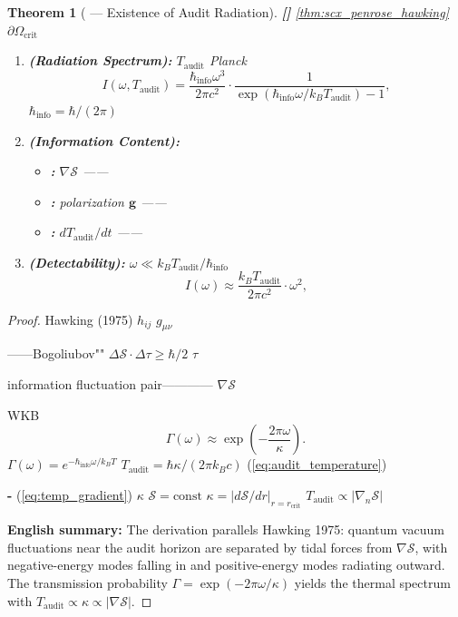\documentclass[12pt,a4paper]{article}
\newtheorem{theorem}{Theorem}[section]
\theoremstyle{remark}
\newcommand{\g}{\mathbf{g}}
\newcommand{\rigorFull}{\textnormal{\textbf{[]}}}
\newcommand{\cC}{c}          %
\newcommand{\cK}{\kappa}     %
\newcommand{\cH}{\hbar}      %
\begin{document}
\begin{theorem}[ — Existence of Audit Radiation]\label{thm:audit_radiation}\rigorFull
\ref{thm:scx_penrose_hawking} $\partial\Omega_{\mathrm{crit}}$ 
\begin{enumerate}[label=(\roman*)]
    \item \textbf{ (Radiation Spectrum):}  $T_{\mathrm{audit}}$ Planck
    \begin{equation}
        I(\omega, T_{\mathrm{audit}}) = \frac{\hbar_{\mathrm{info}} \omega^3}{2\pi \cC^2} \cdot \frac{1}{\exp(\hbar_{\mathrm{info}}\omega / k_B T_{\mathrm{audit}}) - 1},
        \label{eq:planck_audit}
    \end{equation}
     $\hbar_{\mathrm{info}} = \cH/(2\pi)$ 
    
    \item \textbf{ (Information Content):} 
    \begin{itemize}
        \item \textbf{:}  $\nabla\mathcal{S}$ ——
        \item \textbf{:} polarization $\g$ ——
        \item \textbf{:}  $dT_{\mathrm{audit}}/dt$ ——
    \end{itemize}
    
    \item \textbf{ (Detectability):} $\omega \ll k_B T_{\mathrm{audit}}/\hbar_{\mathrm{info}}$
    \begin{equation}
        I(\omega) \approx \frac{k_B T_{\mathrm{audit}}}{2\pi \cC^2} \cdot \omega^2,
    \end{equation}
    
\end{enumerate}
\end{theorem}

\begin{proof}
Hawking (1975)  $h_{ij}$  $g_{\mu\nu}$ 

\textbf{}
——Bogoliubov"" $\Delta\mathcal{S} \cdot \Delta\tau \geq \cH/2$ $\tau$ 

information fluctuation pair———— $\nabla\mathcal{S}$ 

\textbf{}
WKB
\begin{equation}
    \Gamma(\omega) \approx \exp\left(-\frac{2\pi\omega}{\cK}\right).
\end{equation}
 $\Gamma(\omega) = e^{-\hbar_{\mathrm{info}}\omega/k_B T}$  $T_{\mathrm{audit}} = \cH\cK/(2\pi k_B\cC)$ (\ref{eq:audit_temperature})

\textbf{-}
 (\ref{eq:temp_gradient})  $\cK$  $\mathcal{S} = \mathrm{const}$  $\cK = |d\mathcal{S}/dr|_{r=r_{\mathrm{crit}}}$  $T_{\mathrm{audit}} \propto |\nabla_n\mathcal{S}|$

\textbf{English summary:} The derivation parallels Hawking 1975: quantum vacuum fluctuations near the audit horizon are separated by tidal forces from $\nabla\mathcal{S}$, with negative-energy modes falling in and positive-energy modes radiating outward. The transmission probability $\Gamma = \exp(-2\pi\omega/\cK)$ yields the thermal spectrum with $T_{\mathrm{audit}} \propto \cK \propto |\nabla\mathcal{S}|$.
\end{proof}
\end{document}
